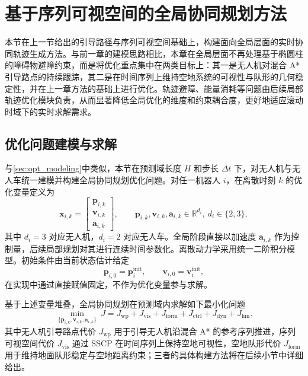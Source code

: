 \section{基于序列可视空间的全局协同规划方法} \label{sec:sscp-global}
本节在上一节给出的引导路径与序列可视空间基础上，构建面向全局层面的实时协同轨迹生成方法。与前一章的建模思路相比，本章在全局层面不再处理基于椭圆柱的障碍物避障约束，而是将优化重点集中在两类目标上：其一是无人机对混合 A* 引导路点的持续跟踪，其二是在时间序列上维持空地系统的可视性与队形的几何稳定性，并在上一章方法的基础上进行优化。轨迹避障、能量消耗等问题由后续局部轨迹优化模块负责，从而显著降低全局优化的维度和约束耦合度，更好地适应滚动时域下的实时求解需求。

\subsection{优化问题建模与求解}\label{sec:opt_que}

与\autoref{sec:opt_modeling}中类似，本节在预测域长度 \(H\) 和步长 \(\Delta t\) 下，对无人机与无人车统一建模并构建全局协同规划优化问题。对任一机器人 \(i\)，在离散时刻 \(k\) 的优化变量定义为
\begin{equation}
\label{eq:state_stack_final}
\mathbf{x}_{i,k}=
\begin{bmatrix}
\mathbf{p}_{i,k}\\[2pt]
\mathbf{v}_{i,k}\\[2pt]
\mathbf{a}_{i,k}
\end{bmatrix},\qquad
\mathbf{p}_{i,k},\mathbf{v}_{i,k},\mathbf{a}_{i,k}\in\mathbb{R}^{d_i},\ d_i\in\{2,3\},
\end{equation}
其中 \(d_i=3\) 对应无人机，\(d_i=2\) 对应无人车。全局阶段直接以加速度 \(\mathbf{a}_{i,k}\) 作为控制量，后续局部规划对其进行连续时间参数化。离散动力学采用统一二阶积分模型。初始条件由当前状态估计给定
\begin{equation}
\label{eq:init_cond_final}
\mathbf{p}_{i,0}=\mathbf{p}^{\mathrm{init}}_{i},\qquad
\mathbf{v}_{i,0}=\mathbf{v}^{\mathrm{init}}_{i},
\end{equation}
在实现中通过直接赋值固定，不作为优化变量参与求解。

基于上述变量堆叠，全局协同规划在预测域内求解如下最小化问题
\begin{equation}
\label{eq:J_total_final}
\min_{\{\mathbf{p}_{i,k},\mathbf{v}_{i,k},\mathbf{a}_{i,k}\}}~J
=J_{\mathrm{wp}}+J_{\mathrm{vis}}+J_{\mathrm{form}}
+J_{\mathrm{ctrl}}+J_{\mathrm{dyn}}+J_{\mathrm{lim}}.
\end{equation}
其中无人机引导路点代价 \(J_{\mathrm{wp}}\) 用于引导无人机沿混合 A* 的参考序列推进，序列可视空间代价 \(J_{\mathrm{vis}}\) 通过 SSCP 在时间序列上保持空地可视性，空地队形代价 \(J_{\mathrm{form}}\) 用于维持地面队形稳定与空地距离约束；三者的具体构建方法将在后续小节中详细给出。

